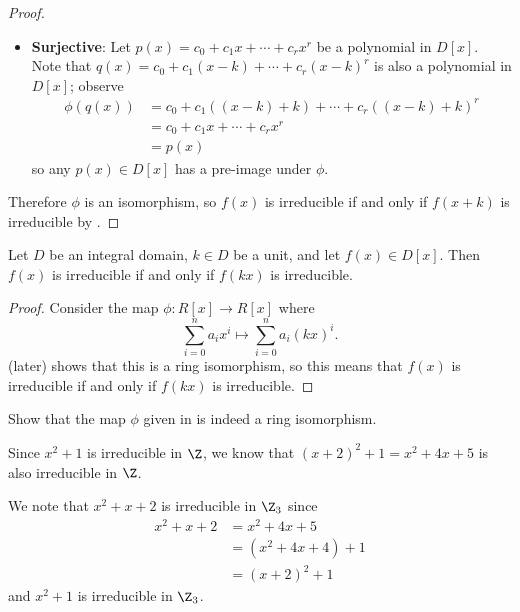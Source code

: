 \begin{proof}
\begin{itemize}
        \item \textbf{Surjective}: Let $p(x) = c_0 + c_1x + \cdots + c_rx^r$ be a polynomial in $D[x]$. Note that $q(x) = c_0 + c_1(x-k) + \cdots + c_r(x-k)^r$ is also a polynomial in $D[x]$; observe
        \begin{align*}
            \phi(q(x)) &= c_0 + c_1((x-k)+k) + \cdots + c_r((x-k)+k)^r\\
            &= c_0 + c_1x + \cdots + c_rx^r\\
            &= p(x)
        \end{align*}
        so any $p(x) \in D[x]$ has a pre-image under $\phi$.
    \end{itemize}
    Therefore $\phi$ is an isomorphism, so $f(x)$ is irreducible if and only if $f(x+k)$ is irreducible by .
\end{proof}

\begin{corollary}\label{coro-irreducible-iff-constant-factor-multiple-is-irreducible}
    Let $D$ be an integral domain, $k \in D$ be a unit, and let $f(x) \in D[x]$. Then $f(x)$ is irreducible if and only if $f(kx)$ is irreducible.
\end{corollary}
\begin{proof}
    Consider the map $\phi: R[x] \to R[x]$ where
    \[
        \sum_{i=0}^n a_ix^i \mapsto \sum_{i=0}^na_i(kx)^i.  
    \]
     (later) shows that this is a ring isomorphism, so this means that $f(x)$ is irreducible if and only if $f(kx)$ is irreducible.
\end{proof}

\begin{exercise}\label{exercise-substitution-by-constant-factor-multiple-map}
    Show that the map $\phi$ given in  is indeed a ring isomorphism.
\end{exercise}

\begin{example}
    Since $x^2 + 1$ is irreducible in $\Z$, we know that $(x+2)^2 + 1 = x^2 + 4x + 5$ is also irreducible in $\Z$.
\end{example}

\begin{example}
    We note that $x^2 + x + 2$ is irreducible in $\Z_3$ since
    \begin{align*}
        x^2 + x + 2 &= x^2 + 4x + 5\\
        &= (x^2 + 4x + 4) + 1\\
        &= (x+2)^2 + 1
    \end{align*}
    and $x^2 + 1$ is irreducible in $\Z_3$.
\end{example}

